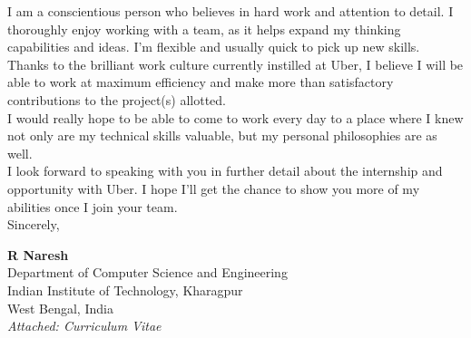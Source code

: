 \documentclass[a4paper,10pt]{extarticle} %
\begin{document}
I am a conscientious person who believes in hard work and attention to detail. I thoroughly enjoy working with a team, as it helps expand my thinking capabilities and ideas. I’m ﬂexible and usually quick to pick up new skills. Thanks to the brilliant work culture currently instilled at Uber, I believe I will be able to work at maximum eﬃciency and make more than satisfactory contributions to the project(s) allotted.\\

I would really hope to be able to come to work every day to a place where I knew not only are my technical skills valuable, but my personal philosophies are as well. \\

I look forward to speaking with you in further detail about the internship and opportunity with Uber. I hope I’ll get the chance to show you more of my abilities once I join your team.\\

Sincerely,

\textbf{\large{R Naresh}}\\
Department of Computer Science and Engineering\\
Indian Institute of Technology, Kharagpur\\
West Bengal, India\\

\itshape{Attached: Curriculum Vitae}
\end{document}
